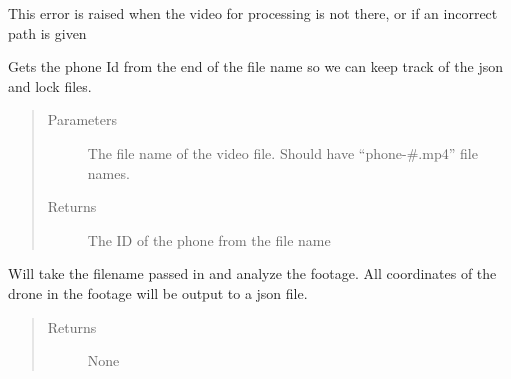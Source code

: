 \documentclass[letterpaper,10pt,english]{sphinxmanual}
\begin{document}

\begin{fulllineitems}
\label{\detokenize{index:src.Controllers.OpenCVThreadedController.VideoNotPresentException}}
This error is raised when the video for processing is not there, or if an incorrect path is given

\end{fulllineitems}


\begin{fulllineitems}
\label{\detokenize{index:src.Controllers.OpenCVThreadedController.get_phone_id}}
Gets the phone Id from the end of the file name so we can keep track of the json and lock files.
\begin{quote}\begin{description}
\item[{Parameters}] \leavevmode
{} \textendash{} The file name of the video file. Should have “phone-\#.mp4” file names.

\item[{Returns}] \leavevmode
The ID of the phone from the file name

\end{description}\end{quote}

\end{fulllineitems}


\begin{fulllineitems}
\label{\detokenize{index:src.Controllers.OpenCVThreadedController.main}}
Will take the filename passed in and analyze the footage. All coordinates of the drone in the footage
will be output to a json file.
\begin{quote}\begin{description}
\item[{Returns}] \leavevmode
None

\end{description}\end{quote}

\end{fulllineitems}
\end{document}
